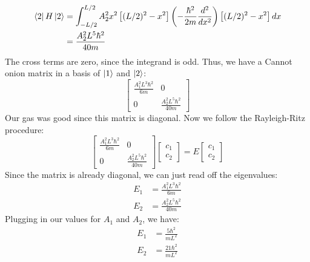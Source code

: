 \documentclass{article}
\begin{document}
\begin{align}
    \bra{2}H\ket{2} &= \int_{-L/2}^{L/2} A_2^2 x^2 \left[ (L/2)^2 - x^2 \right] \left(-\frac{\hbar^2}{2m}\frac{d^2}{dx^2}\right) \left[ (L/2)^2 - x^2 \right] dx \\ &= \frac{A_2^2L^5\hbar^2}{40m}
\end{align}
The cross terms are zero, since the integrand is odd. Thus, we have a Cannot onion matrix in a basis of $\ket{1}$ and $\ket{2}$:
\begin{equation}
    \begin{bmatrix}
    \frac{A_1^2L^3\hbar^2}{6m} & 0 \\
    0 & \frac{A_2^2L^5\hbar^2}{40m}
    \end{bmatrix}
\end{equation}
Our gas was good since this matrix is diagonal. Now we follow the Rayleigh-Ritz procedure:
\begin{equation}
    \begin{bmatrix}
    \frac{A_1^2L^3\hbar^2}{6m} & 0 \\
    0 & \frac{A_2^2L^5\hbar^2}{40m}
    \end{bmatrix}
    \begin{bmatrix}
    c_1 \\
    c_2
    \end{bmatrix}
    = E
    \begin{bmatrix}
    c_1 \\
    c_2
    \end{bmatrix}
\end{equation}
Since the matrix is already diagonal, we can just read off the eigenvalues:
\begin{align}
    E_1 &= \frac{A_1^2L^3\hbar^2}{6m} \\
    E_2 &= \frac{A_2^2L^5\hbar^2}{40m}
\end{align}
Plugging in our values for $A_1$ and $A_2$, we have:
\begin{align}
    E_1 &= \frac{5\hbar^2}{mL^2} \\
    E_2 &= \frac{21\hbar^2}{mL^2}
\end{align}
\end{document}
